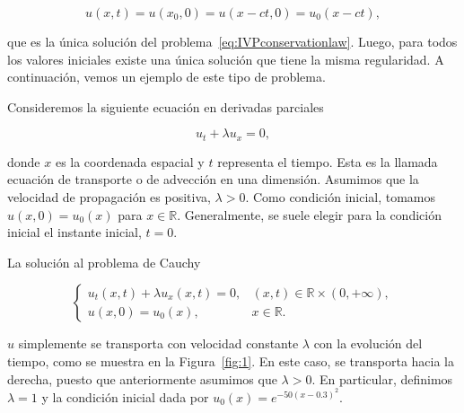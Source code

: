 \begin{equation*}
  u\left(x,t\right)=
  u\left(x_{0},0\right)=
  u\left(x-ct,0\right)=
  u_{0}\left(x-ct\right),
\end{equation*}

que es la única solución del problema~\eqref{eq:IVPconservationlaw}.
Luego, para todos los valores iniciales existe una única solución que
tiene la misma regularidad.
A continuación, vemos un ejemplo de este tipo de problema.

\begin{example}
  Consideremos la siguiente ecuación en derivadas parciales

  \begin{equation*}
    u_{t}+
    \lambda u_{x}=
    0,
  \end{equation*}

  donde $x$ es la coordenada espacial y $t$ representa el tiempo.
  Esta es la llamada ecuación de transporte o de advección en una
  dimensión.
  Asumimos que la velocidad de propagación es positiva, $\lambda>0$.
  Como condición inicial, tomamos
  \begin{math}
    u\left(x,0\right)=
    u_{0}\left(x\right)
  \end{math}
  para $x\in\mathbb{R}$.
  Generalmente, se suele elegir para la condición inicial el instante
  inicial, $t=0$.

  La solución al problema de Cauchy

  \begin{equation*}
    \begin{cases}
      u_{t}
      \left(x,t\right)+
      \lambda
      u_{x}
      \left(x,t\right)=
      0,                   &
      \left(x,t\right)\in
      \mathbb{R}\times
      \left(0,+\infty\right), \\
      u\left(x,0\right)=
      u_{0}\left(x\right), &
      x\in\mathbb{R}.
    \end{cases}
  \end{equation*}
\end{example}

$u$ simplemente se transporta con velocidad constante $\lambda$ con
la evolución del tiempo, como se muestra en la Figura~\ref{fig:1}.
En este caso, se transporta hacia la derecha, puesto que
anteriormente asumimos que $\lambda>0$.
En particular, definimos $\lambda=1$ y la condición inicial dada por
\begin{math}
  u_{0}
  \left(x\right)=
  e^{-50{\left(x-0.3\right)}^{2}}
\end{math}.

